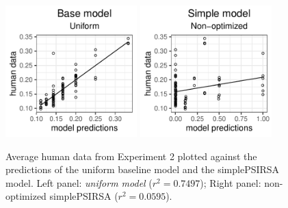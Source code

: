 \documentclass[10pt,a4paper]{article}
\begin{document}
\begin{figure}[ht]
	\centering
	\includegraphics[width=2in]{images/x3_m20.pdf}
	\includegraphics[width=2in]{images/x3_m7.pdf}
	\caption{Average human data from Experiment 2 plotted against the predictions of the uniform baseline model and the simplePSIRSA model. 
		Left panel: \emph{uniform model} ($r^{2}=0.7497$);
		Right panel: non-optimized simplePSIRSA ($r^2=0.0595$).
	}
	\label{base-nonopt-x3}
\end{figure}


\end{document}
